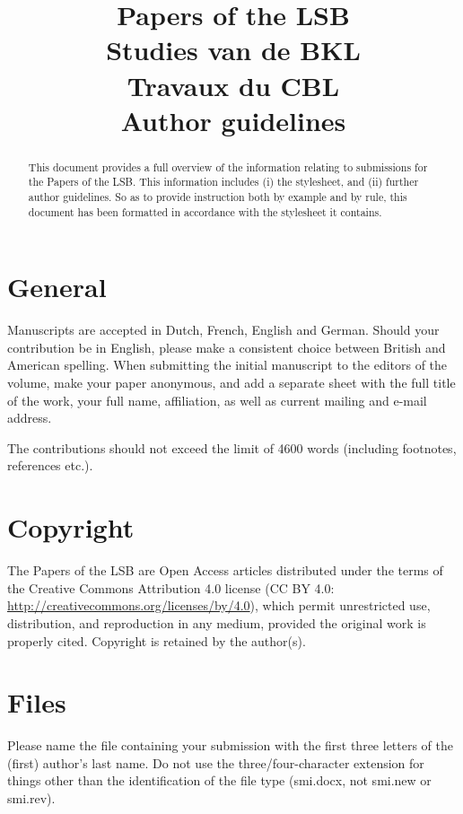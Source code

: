 \documentclass[times,linguex]{lsb}
\title[Author Guidelines]{Papers of the LSB\\ 
Studies van de BKL\\
Travaux du CBL\\
\Large Author guidelines}
\author[Guido Vanden Wyngaerd]%
{
\spauthor{Guido Vanden Wyngaerd \\ 
\institute{KU Leuven}} 
}
\begin{document}
\maketitle

\begin{abstract} \normalsize  This document provides a full overview of the information relating to submissions for the Papers of the LSB. This information includes (i) the stylesheet, and (ii) further author guidelines. So as to provide instruction both by example and by rule, this document has been formatted in accordance with the stylesheet it contains.
\end{abstract}

\clearpage

\section{General}

Manuscripts are accepted in Dutch, French, English and German. Should your contribution be in English, please make a consistent choice between British and American spelling. When submitting the initial manuscript to the editors of the volume, make your paper anonymous, and  add a separate sheet with the full title of the work, your full name, affiliation, as well as current mailing and e-mail address.

The contributions should not exceed the limit of 4600 words (including footnotes, references etc.). 

\section{Copyright}

The Papers of the LSB are Open Access articles distributed under the terms of the Creative Commons Attribution 4.0 license (CC BY 4.0: \url{http://creativecommons.org/licenses/by/4.0}), which permit unrestricted use, distribution, and reproduction in any medium, provided the original work is properly cited. Copyright is retained by the author(s).

\section{Files}

Please name the file containing your submission with the first three letters of the (first) author’s last name. Do not use the three/four-character extension for things other than the identification of the file type (smi.docx, not smi.new or smi.rev). 
\end{document}
